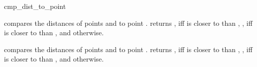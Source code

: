 \begin{ccRefFunction}{cmp_dist_to_point}

          {compares the distances of points  and
            to point .
          returns , iff  is closer
          to  than , , iff
           is closer to  than , and
           otherwise.}

          {compares the distances of points  and
            to point .
          returns , iff  is closer
          to  than , , iff
           is closer to  than , and
           otherwise.}
\end{ccRefFunction}

